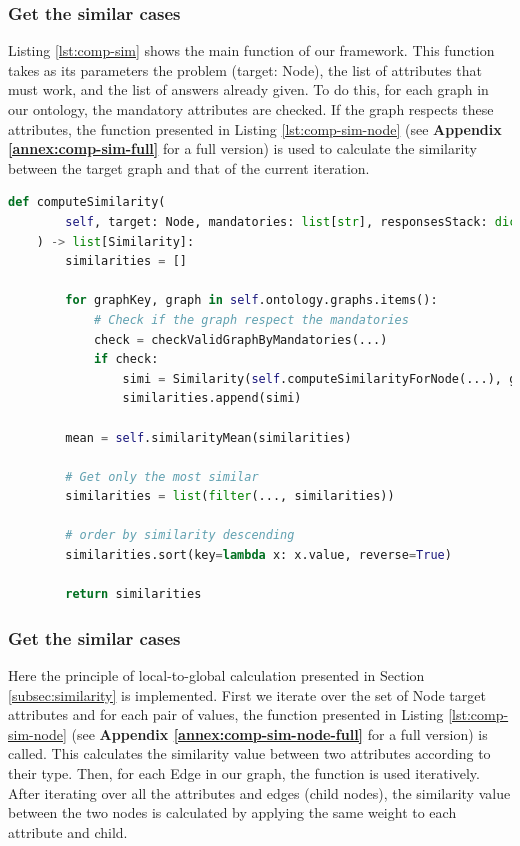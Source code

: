 \subsubsection{Get the similar cases}
Listing \ref{lst:comp-sim} shows the main function of our framework. This function takes as its parameters the problem (target: Node), the list of attributes that must work, and the list of answers already given. To do this, for each graph in our ontology, the mandatory attributes are checked. If the graph respects these attributes, the function presented in Listing \ref{lst:comp-sim-node} (see \textbf{Appendix \ref{annex:comp-sim-full}} for a full version) is used to calculate the similarity between the target graph and that of the current iteration.\\


\begin{lstlisting}[language=Python, caption=Function to find the similarity between one case and all the cases in the data-base, label={lst:comp-sim}]
def computeSimilarity(
        self, target: Node, mandatories: list[str], responsesStack: dict[str, Any]
    ) -> list[Similarity]:
        similarities = []

        for graphKey, graph in self.ontology.graphs.items():
            # Check if the graph respect the mandatories
            check = checkValidGraphByMandatories(...)
            if check:
                simi = Similarity(self.computeSimilarityForNode(...), graph)
                similarities.append(simi)

        mean = self.similarityMean(similarities)

        # Get only the most similar
        similarities = list(filter(..., similarities))

        # order by similarity descending
        similarities.sort(key=lambda x: x.value, reverse=True)

        return similarities
\end{lstlisting}
    
    
    
\subsubsection{Get the similar cases} 
Here the principle of local-to-global calculation presented in Section \ref{subsec:similarity} is implemented. First we iterate over the set of Node target attributes and for each pair of values, the function presented in Listing \ref{lst:comp-sim-node} (see \textbf{Appendix \ref{annex:comp-sim-node-full}} for a full version) is called. This calculates the similarity value between two attributes according to their type. Then, for each Edge in our graph, the function is used iteratively.
After iterating over all the attributes and edges (child nodes), the similarity value between the two nodes is calculated by applying the same weight to each attribute and child.\\

